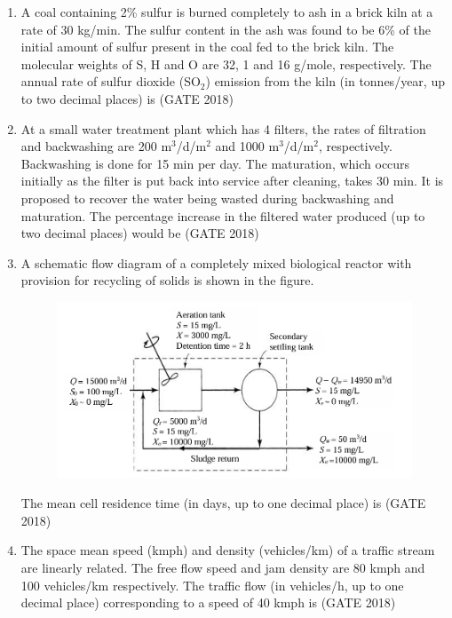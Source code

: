 \documentclass[journal,12pt,onecolumn]{IEEEtran}
\theoremstyle{remark}
\begin{document}
\begin{enumerate}
\item A coal containing 2\% sulfur is burned completely to ash in a brick kiln at a rate of 30 kg/min. The sulfur content in the ash was found to be 6\% of the initial amount of sulfur present in the coal fed to the brick kiln. The molecular weights of S, H and O are 32, 1 and 16 g/mole, respectively. The annual rate of sulfur dioxide (SO$_2$) emission from the kiln (in tonnes/year, up to two decimal places) is \underline{\hspace{3cm}}
\hfill{(GATE 2018)}
\vspace{1cm}

\item At a small water treatment plant which has 4 filters, the rates of filtration and backwashing are 200 m$^3$/d/m$^2$ and 1000 m$^3$/d/m$^2$, respectively. Backwashing is done for 15 min per day. The maturation, which occurs initially as the filter is put back into service after cleaning, takes 30 min. It is proposed to recover the water being wasted during backwashing and maturation. The percentage increase in the filtered water produced (up to two decimal places) would be \underline{\hspace{3cm}}
\hfill{(GATE 2018)}
\vspace{1cm}

\item A schematic flow diagram of a completely mixed biological reactor with provision for recycling of solids is shown in the figure.
\begin{figure}[h]
    \centering
    \includegraphics[width=0.5\linewidth]{GATE-CE-2018/52-2.png}
    \caption{}
    \label{52-2}
\end{figure}
The mean cell residence time (in days, up to one decimal place) is \underline{\hspace{3cm}}
\hfill{(GATE 2018)}
\vspace{1cm}

\item The space mean speed (kmph) and density (vehicles/km) of a traffic stream are linearly related. The free flow speed and jam density are 80 kmph and 100 vehicles/km respectively. The traffic flow (in vehicles/h, up to one decimal place) corresponding to a speed of 40 kmph is \underline{\hspace{3cm}}
\hfill{(GATE 2018)}
\vspace{1cm}


\end{enumerate}
\end{document}
